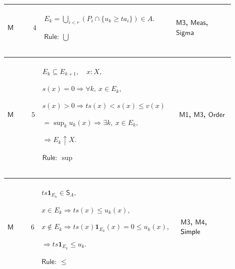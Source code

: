 \documentclass[12pt,reqno]{amsart}
\theoremstyle{blueplain}
\numberwithin{equation}{section}
\begin{document}
{\scriptsize \setlength{\parskip}{0pt}\nointerlineskip
\noindent 
\begin{tabular}{|@{}>{\centering\arraybackslash}m{0.10658\linewidth}|>{\centering\arraybackslash}m{0.03553\linewidth}|>{\centering\arraybackslash}m{0.52105\linewidth}|>{\centering\arraybackslash}m{0.23684\linewidth}|}
\hline
\hypertarget{proof:M4}{$\displaystyle \mathsf{M}$} & $\displaystyle 4$ & $%
\displaystyle E_k=\bigcup_{i<r}(P_i\cap\{u_k\ge ta_i\})\in A.$\par$%
\displaystyle \mathsf{Rule}:\ \bigcup$ & \hyperlink{proof:M3}{$\displaystyle 
\mathsf{M3}$}, \hyperlink{lem:Meas}{$\displaystyle \mathsf{Meas}$}, 
\hyperlink{ax:Sigma}{$\displaystyle \mathsf{Sigma}$} \\ \hline
\end{tabular}%
}

{\scriptsize \setlength{\parskip}{0pt}\nointerlineskip
\noindent 
\begin{tabular}{|@{}>{\centering\arraybackslash}m{0.10658\linewidth}|>{\centering\arraybackslash}m{0.03553\linewidth}|>{\centering\arraybackslash}m{0.52105\linewidth}|>{\centering\arraybackslash}m{0.23684\linewidth}|}
\hline
\hypertarget{proof:M5}{$\displaystyle \mathsf{M}$} & $\displaystyle 5$ & $%
\displaystyle E_k\subseteq E_{k+1},\quad x:X,$\par$\displaystyle %
s(x)=0\Rightarrow\forall k,\ x\in E_k,$\par$\displaystyle s(x)>0\Rightarrow
ts(x)<s(x)\le v(x)$\par$\displaystyle {}=\sup_k u_k(x)\Rightarrow\exists k,\
x\in E_k,$\par$\displaystyle \Rightarrow E_k\uparrow X.$\par$\displaystyle 
\mathsf{Rule}:\ \sup$ & \hyperlink{proof:M1}{$\displaystyle \mathsf{M1}$}, 
\hyperlink{proof:M3}{$\displaystyle \mathsf{M3}$}, \hyperlink{ax:Order}{$%
\displaystyle \mathsf{Order}$} \\ \hline
\end{tabular}%
}

{\scriptsize \setlength{\parskip}{0pt}\nointerlineskip
\noindent 
\begin{tabular}{|@{}>{\centering\arraybackslash}m{0.10658\linewidth}|>{\centering\arraybackslash}m{0.03553\linewidth}|>{\centering\arraybackslash}m{0.52105\linewidth}|>{\centering\arraybackslash}m{0.23684\linewidth}|}
\hline
\hypertarget{proof:M6}{$\displaystyle \mathsf{M}$} & $\displaystyle 6$ & $%
\displaystyle ts\mathbf{1}_{E_k}\in\mathsf{S}_A,$\par$\displaystyle x\in
E_k\Rightarrow ts(x)\le u_k(x),$\par$\displaystyle x\notin E_k\Rightarrow
ts(x)\mathbf{1}_{E_k}(x)=0\le u_k(x),$\par$\displaystyle \Rightarrow ts%
\mathbf{1}_{E_k}\le u_k.$\par$\displaystyle \mathsf{Rule}:\ \le$ & 
\hyperlink{proof:M3}{$\displaystyle \mathsf{M3}$}, \hyperlink{proof:M4}{$%
\displaystyle \mathsf{M4}$}, \hyperlink{lem:Simple}{$\displaystyle \mathsf{%
Simple}$} \\ \hline
\end{tabular}%
}
\end{document}
